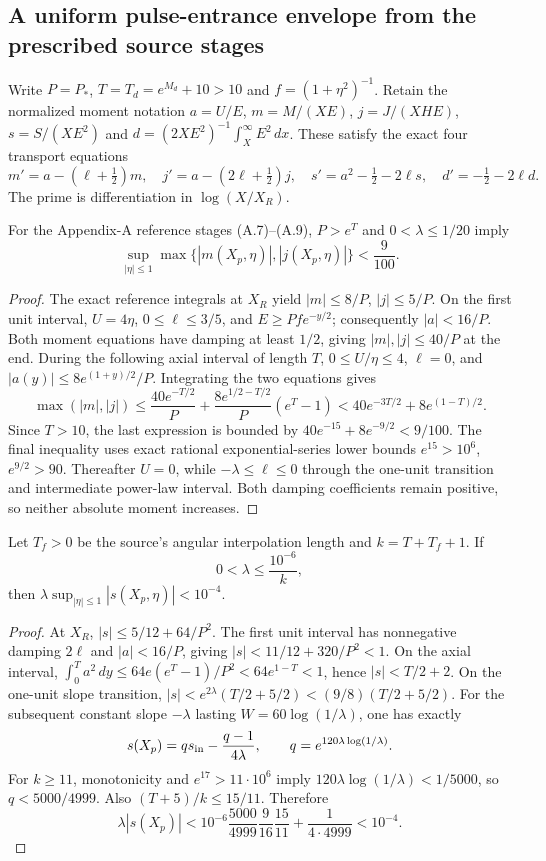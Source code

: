 \subsection*{A uniform pulse-entrance envelope from the prescribed source stages}
Write $P=P_*$, $T=T_d=e^{M_d}+10>10$ and $f=(1+\eta^2)^{-1}$. Retain the normalized moment notation
$a=U/E$, $m=M/(XE)$, $j=J/(XHE)$,
$s=S/(XE^2)$ and $d=(2XE^2)^{-1}\int_X^\infty E^2\,dx$.
These satisfy the exact four transport equations
\[
m'=a-(\ell+\tfrac12)m,\quad j'=a-(2\ell+\tfrac12)j,\quad
s'=a^2-\tfrac12-2\ell s,\quad d'=-\tfrac12-2\ell d.
\]
The prime is differentiation in $\log(X/X_R)$.

\begin{proposition}\label{prop:uniform-source-prepulse}
For the Appendix-A reference stages (A.7)--(A.9), $P>e^T$ and
$0<\lambda\le1/20$ imply
\[
\sup_{|\eta|\le1}\max\{|m(X_p,\eta)|,|j(X_p,\eta)|\}<\frac9{100}.
\]
\end{proposition}
\begin{proof}
The exact reference integrals at $X_R$ yield
$|m|\le8/P$, $|j|\le5/P$. On the first unit interval,
$U=4\eta$, $0\le\ell\le3/5$, and
$E\ge Pf e^{-y/2}$; consequently $|a|<16/P$.
Both moment equations have damping at least $1/2$, giving
$|m|,|j|\le40/P$ at the end.
During the following axial interval of length $T$,
$0\le U/\eta\le4$, $\ell=0$, and
$|a(y)|\le8e^{(1+y)/2}/P$. Integrating the two equations gives
\[
\max(|m|,|j|)
\le\frac{40e^{-T/2}}P+
\frac{8e^{1/2-T/2}}P(e^T-1)
<40e^{-3T/2}+8e^{(1-T)/2}.
\]
Since $T>10$, the last expression is bounded by
$40e^{-15}+8e^{-9/2}<9/100$.
The final inequality uses exact rational exponential-series lower
bounds $e^{15}>10^6$, $e^{9/2}>90$.
Thereafter $U=0$, while $-\lambda\le\ell\le0$ through the
one-unit transition and intermediate power-law interval.
Both damping coefficients remain positive, so neither absolute
moment increases.
\end{proof}

\begin{proposition}
\label{prop:source-forward-s-explicit}
Let $T_f>0$ be the source's angular interpolation length and
$k=T+T_f+1$. If
\[
0<\lambda\le\frac{10^{-6}}k,
\]
then $\lambda\sup_{|\eta|\le1}|s(X_p,\eta)|<10^{-4}$.
\end{proposition}
\begin{proof}
At $X_R$, $|s|\le5/12+64/P^2$. The first unit interval has
nonnegative damping $2\ell$ and $|a|<16/P$, giving
$|s|<11/12+320/P^2<1$. On the axial interval,
$\int_0^T a^2\,dy\le64e(e^T-1)/P^2<64e^{1-T}<1$,
hence $|s|<T/2+2$. On the one-unit slope transition,
$|s|<e^{2\lambda}(T/2+5/2)<(9/8)(T/2+5/2)$.
For the subsequent constant slope $-\lambda$ lasting
$W=60\log(1/\lambda)$, one has exactly
\[
s(X_p)=q s_{\rm in}-\frac{q-1}{4\lambda},\qquad
q=e^{120\lambda\log(1/\lambda)}.
\]
For $k\ge11$, monotonicity and $e^{17}>11\cdot10^6$ imply
$120\lambda\log(1/\lambda)<1/5000$, so $q<5000/4999$.
Also $(T+5)/k\le15/11$. Therefore
\[
\lambda|s(X_p)|
<10^{-6}\frac{5000}{4999}\frac9{16}\frac{15}{11}
+\frac1{4\cdot4999}<10^{-4}.
\]
\end{proof}

